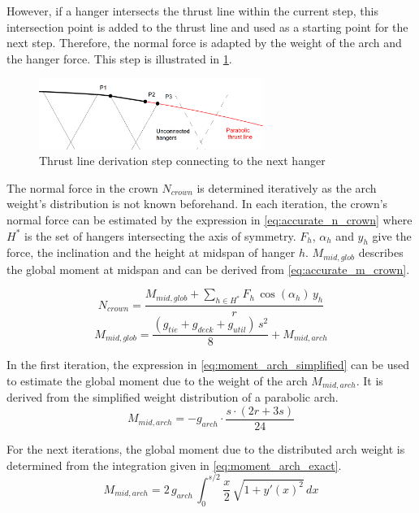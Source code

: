However, if a hanger intersects the thrust line within the current step, this intersection point is added to the thrust line and used as a starting point for the next step. Therefore, the normal force is adapted by the weight of the arch and the hanger force. This step is illustrated in \cref{fig:discrete_2}.

\begin{figure}[H]
    \centering
    \includegraphics[width=0.65\textwidth]{overleaf/Appendix/Pictures/discrete_thrust_line_2.PNG}
    \caption{Thrust line derivation step connecting to the next hanger}
    \label{fig:discrete_2}
\end{figure}

The normal force in the crown $N_{crown}$ is determined iteratively as the arch weight's distribution is not known beforehand. In each iteration, the crown's normal force can be estimated by the expression in \cref{eq:accurate_n_crown} where $H^*$ is the set of hangers intersecting the axis of symmetry. $F_h$, $\alpha_h$ and $y_h$ give the force, the inclination and the height at midspan of hanger $h$. $M_{mid,glob}$ describes the global moment at midspan and can be derived from \cref{eq:accurate_m_crown}.

\begin{equation}
    N_{crown} = \frac{{M_{mid,glob}+\sum\limits_{h\in H^*}^{}F_h\,\cos(\alpha_h)\,y_h}}{r}
    \label{eq:accurate_n_crown}
\end{equation}
\begin{equation}
    M_{mid,glob} = \frac{(g_{tie}+g_{deck}+g_{util})\,s^2}{8} + M_{mid,arch}
    \label{eq:accurate_m_crown}
\end{equation}

In the first iteration, the expression in \cref{eq:moment_arch_simplified} can be used to estimate the global moment due to the weight of the arch $M_{mid,arch}$. It is derived from the simplified weight distribution of a parabolic arch.
\begin{equation}
    M_{mid,arch}=-g_{arch}\cdot\frac{s\cdot(2r+3s)}{24}
    \label{eq:moment_arch_simplified}
\end{equation}

For the next iterations, the global moment due to the distributed arch weight is determined from the integration given in \cref{eq:moment_arch_exact}.
\begin{equation}
    M_{mid,arch}= 2\,g_{arch}\,\int_{0}^{s/2} \frac{x}{2}\,\sqrt{1+y'(x)^2} \,dx
    \label{eq:moment_arch_exact}
\end{equation}


